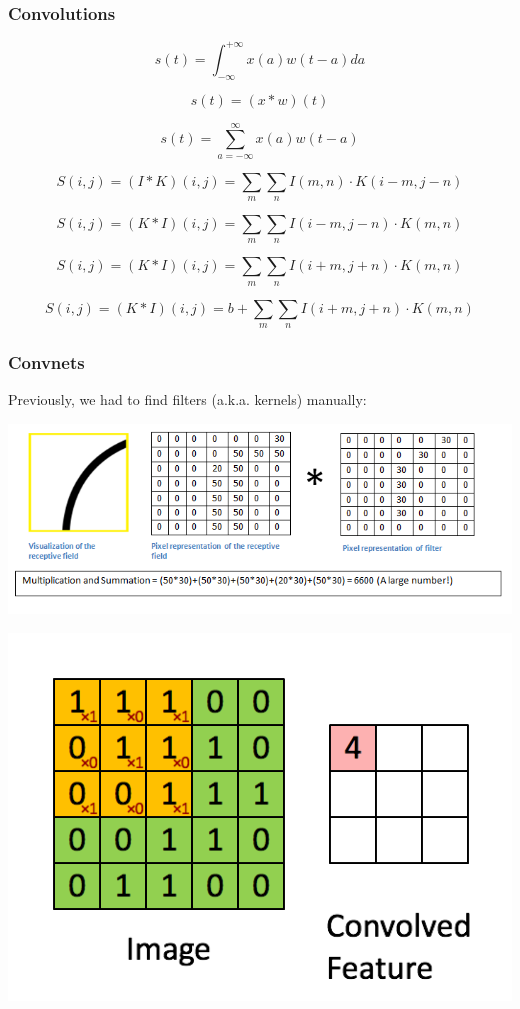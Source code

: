 \documentclass[11pt]{article}
\makeatletter
\def\maxwidth{\ifdim\Gin@nat@width>\linewidth\linewidth
    \else\Gin@nat@width\fi}
\let\Oldincludegraphics\includegraphics
\renewcommand{\includegraphics}[1]{\Oldincludegraphics[width=.8\maxwidth]{#1}}
\makeatother
\begin{document}
    \hypertarget{convolutions}{%
\subsubsection{Convolutions}\label{convolutions}}

\[
s(t) = \int_{-\infty}^{+\infty}{x(a)w(t-a)da}
\]

\[
s(t) = (x * w)(t)
\]

    \[
s(t) = \sum_{a=-\infty}^{\infty}{x(a)w(t-a)}
\]

    \[
S(i, j) = (I * K)(i,j) = \sum_{m}\sum_{n}{I(m,n) \cdot K(i-m,j-n)}
\]

\[
S(i, j) = (K * I)(i,j) = \sum_{m}\sum_{n}{I(i-m, j-n) \cdot K(m,n)}
\]

\[
S(i, j) = (K * I)(i,j) = \sum_{m}\sum_{n}{I(i+m, j+n) \cdot K(m,n)}
\]

    \[
S(i, j) = (K * I)(i,j) = b + \sum_{m}{\sum_{n}{I(i+m, j+n) \cdot K(m,n)}}
\]

    \hypertarget{convnets}{%
\subsubsection{Convnets}\label{convnets}}

Previously, we had to find filters (a.k.a. kernels) manually:

    \includegraphics{FirstPixelMulitiplication.png}

    \includegraphics{./Convolution_schematic.gif}
\end{document}
